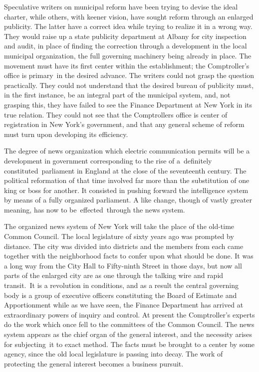 \documentclass[openany,nobib]{tufte-book}
\begin{document}
Speculative writers on municipal reform have been trying to devise the
ideal charter, while others, with keener vision, have sought reform
through an enlarged publicity. The latter have a correct idea while
trying to realize it in a wrong way. They would raise up a state
publicity department at Albany for city inspection and audit, in place
of finding the correction through a development in the local municipal
organization, the full governing machinery being already in place. The
movement must have its first center within the establishment; the
Comptroller's office is primary~in the desired advance. The writers
could not grasp the question practically. They could not understand that
the desired bureau of publicity must, in the first instance, be an
integral part of the municipal system, and, not grasping this, they have
failed to see the Finance Department at New York in its true relation.
They could not see that the Comptroller\textquotesingle s office is
center of registration in New York's government, and that any general
scheme of reform must turn upon developing its efficiency.~

\newpage The degree of news organization which electric communication permits
will be a development in government corresponding to the rise of
a~definitely constituted~parliament in England at the close of the
seventeenth century. The political reformation of that time involved far
more than the substitution of one king or boss for another. It consisted
in pushing forward the intelligence system by means of a fully organized
parliament. A like change, though of vastly greater meaning, has now to
be~effected~through the news system.~

The organized news system of New York will take the place of the
old-time Common Council. The local legislature of sixty years ago was
prompted by distance. The city was divided into districts and the
members from each came together with the neighborhood facts to confer
upon what should be done. It was a long way from the City Hall to
Fifty-ninth Street in those days, but now all parts of the enlarged city
are as one through the talking wire and rapid transit.~It is a
revolution in conditions, and as a result the central governing body is
a group of executive officers constituting the Board of Estimate and
Apportionment while as we have seen, the Finance Department has arrived
at extraordinary powers of inquiry and control. At present the
Comptroller's experts do the work which once fell to the committees of
the Common Council. The news system appears as the chief organ of the
general interest, and the necessity arises for subjecting~it to exact
method. The facts must be brought to a center by some agency, since the
old local legislature is passing into decay. The work of protecting the
general interest becomes a business pursuit.~
\end{document}
